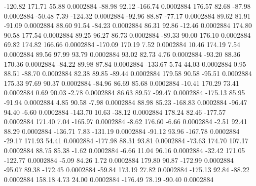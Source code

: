      -120.82      171.71       55.88     0.0002884
      -88.98       92.12     -166.74     0.0002884
      176.57       82.68      -87.98     0.0002884
      -50.48        7.39     -124.32     0.0002884
      -92.96       88.87      -77.17     0.0002884
       89.62       81.91      -91.09     0.0002884
       88.60       91.54      -84.23     0.0002884
       86.31       92.86      -12.46     0.0002884
      174.80       90.58      177.54     0.0002884
       89.25       96.27       86.73     0.0002884
      -89.33       90.00      176.10     0.0002884
       69.82      174.82      166.66     0.0002884
     -170.09      170.19        7.52     0.0002884
       10.46      174.19        7.54     0.0002884
       89.56       97.99       93.79     0.0002884
       93.02       82.73        4.76     0.0002884
      -93.20       88.36      170.36     0.0002884
      -84.22       89.98       87.84     0.0002884
     -133.67        5.74       44.03     0.0002884
        0.95       88.51      -88.70     0.0002884
       82.38       89.85      -89.44     0.0002884
      179.58       90.58      -95.51     0.0002884
      175.33       97.69       90.37     0.0002884
      -84.96       86.69       85.68     0.0002884
      -10.41      170.29       73.41     0.0002884
        0.69       90.03       -2.78     0.0002884
       86.63       89.57      -99.47     0.0002884
     -175.13       85.95      -91.94     0.0002884
        4.85       90.58       -7.98     0.0002884
       88.98       85.23     -168.83     0.0002884
      -96.47       94.40       -6.60     0.0002884
     -143.70       10.63      -38.12     0.0002884
      178.24       82.46     -177.57     0.0002884
      171.40        7.04     -165.97     0.0002884
       -8.62      176.60       -6.66     0.0002884
       -2.51       92.41       88.29     0.0002884
     -136.71        7.83     -131.19     0.0002884
      -91.12       93.96     -167.78     0.0002884
      -29.17      171.93       54.41     0.0002884
     -177.98       88.31       93.81     0.0002884
      -73.63      174.70      107.17     0.0002884
       88.75       85.38       -1.62     0.0002884
       -6.66       11.04       96.16     0.0002884
      -32.42      171.05     -122.77     0.0002884
       -5.09       84.26        1.72     0.0002884
      179.80       90.87     -172.99     0.0002884
      -95.07       89.38     -172.45     0.0002884
      -59.84      173.19       27.82     0.0002884
     -175.13       92.84      -88.22     0.0002884
      158.18        4.73       24.00     0.0002884
     -176.49       78.19      -90.40     0.0002884
